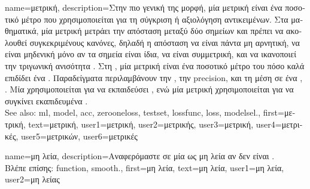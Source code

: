 {name={\foreignlanguage{greek}{μετρική}},
	description={\foreignlanguage{greek}{Στην πιο γενική της μορφή, μία μετρική} 
		\foreignlanguage{greek}{είναι ένα ποσοτικό μέτρο που χρησιμοποιείται για τη σύγκριση ή αξιολόγηση αντικειμένων.  
		Στα μαθηματικά, μία μετρική μετράει την απόσταση μεταξύ δύο σημείων και πρέπει να ακολουθεί συγκεκριμένους 
		κανόνες, δηλαδή η απόσταση να είναι πάντα μη αρνητική, να είναι μηδενική μόνο αν τα σημεία είναι ίδια, να είναι 
		συμμετρική, και να ικανοποιεί την τριγωνική ανισότητα} \cite{RudinBookPrinciplesMatheAnalysis}. 
		\foreignlanguage{greek}{Στη} , \foreignlanguage{greek}{μία μετρική είναι ένα ποσοτικό μέτρο  
		του πόσο καλά επιδίδει ένα} . \foreignlanguage{greek}{Παραδείγματα περιλαμβάνουν την} 
		, \foreignlanguage{greek}{την} precision, \foreignlanguage{greek}{και τη μέση}  
		\foreignlanguage{greek}{σε ένα}  \cite{Goodfellow-et-al-2016}, \cite{BishopBook}. 
		\foreignlanguage{greek}{Μία}  \foreignlanguage{greek}{χρησιμοποιείται για να εκπαιδεύσει} , 
		\foreignlanguage{greek}{ενώ μία μετρική χρησιμοποιείται για να συγκίνει εκαπιδευμένα} . 
		\\ See also: \gls{ml}, \gls{model}, \gls{acc}, \gls{zerooneloss}, \gls{testset}, \gls{lossfunc}, \gls{loss}, \gls{modelsel}.},
	first={\foreignlanguage{greek}{μετρική}}, 
	text={\foreignlanguage{greek}{μετρική}},
	user1={\foreignlanguage{greek}{μετρική}}, %
	user2={\foreignlanguage{greek}{μετρικής}}, %
	user3={\foreignlanguage{greek}{μετρική}}, %
	user4={\foreignlanguage{greek}{μετρικές}}, %
	user5={\foreignlanguage{greek}{μετρικών}}, %
	user6={\foreignlanguage{greek}{μετρικές}} %
}

{name={\foreignlanguage{greek}{μη λεία}},
	description={\foreignlanguage{greek}{Αναφερόμαστε σε μία} 
		 \foreignlanguage{greek}{ως μη λεία αν δεν είναι}  \cite{nesterov04}.\\
		\foreignlanguage{greek}{Βλέπε επίσης:} \gls{function}, \gls{smooth}.},
	first={\foreignlanguage{greek}{μη λεία}},
	text={\foreignlanguage{greek}{μη λεία}},
	user1={\foreignlanguage{greek}{μη λεία}}, %
	user2={\foreignlanguage{greek}{μη λείας}} %
}

